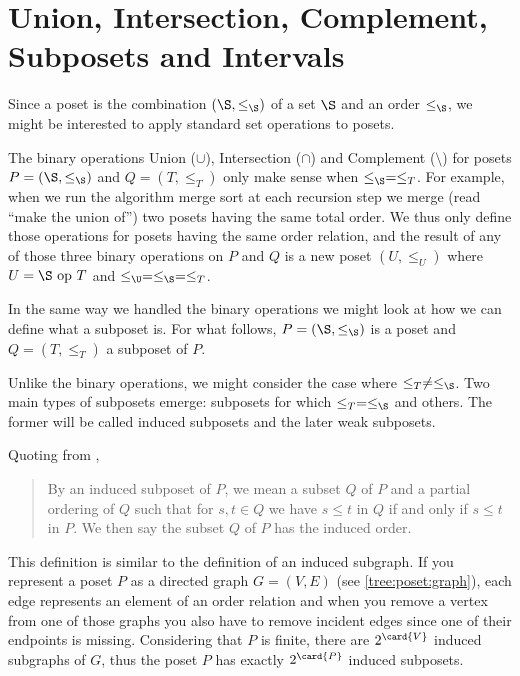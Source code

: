 \section{Union, Intersection, Complement, Subposets and Intervals}
\label{tree:poset:sub}


Since a poset is the combination $(\S, \le_{\S})$ of a set $\S$ and an order
$\le_{\S}$, we might be interested to apply standard set operations to posets.

The binary operations Union ($\cup$), Intersection ($\cap$) and Complement
($\setminus$) for posets $P = (\S, \le_{\S})$ and $Q = (T, \le_T)$ only make sense
when $\le_{\S} = \le_T$. For example, when we run the algorithm merge sort at each
recursion step we merge (read ``make the union of'') two posets having the same
total order. We thus only define those operations for posets having the same
order relation, and the result of any of those three binary operations on $P$
and $Q$ is a new poset $(U, \le_U)$ where $U = \S~\text{op}~T$ and $\le_{\U} =
\le_{\S} = \le_T$.


In the same way we handled the binary operations we might look at how we can
define what a subposet is. For what follows, $P = (\S, \le_{\S})$ is a poset and $Q
= (T, \le_T)$ a subposet of $P$.

Unlike the binary operations, we might consider the case where $\le_T \neq
\le_{\S}$. Two main types of subposets emerge: subposets for which $\le_T =
\le_{\S}$ and others. The former will be called induced subposets and the later
weak subposets.

Quoting from \citet*{Stanley:2011:ECV:2124415},

\begin{quotation}

By an induced subposet of $P$, we mean a subset $Q$ of $P$ and a partial
ordering of $Q$ such that for $s, t \in Q$ we have $s \leq t$ in $Q$ if and
only if $s \leq t$ in $P$. We then say the subset $Q$ of $P$ has the induced
order.

\end{quotation}

This definition is similar to the definition of an induced subgraph. If you
represent a poset $P$ as a directed graph $G = (V, E)$ (see
\ref{tree:poset:graph}), each edge represents an element of an order relation
and when you remove a vertex from one of those graphs you also have to remove
incident edges since one of their endpoints is missing. Considering that $P$ is
finite, there are $2^{\card{V}}$ induced subgraphs of $G$, thus the poset $P$ has
exactly $2^{\card{P}}$ induced subposets.

